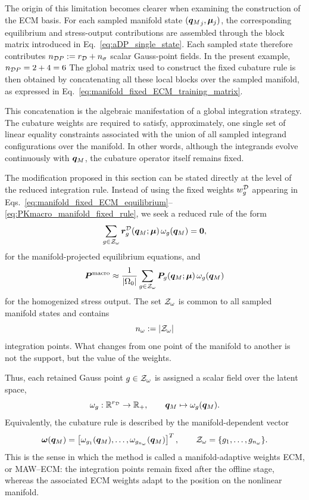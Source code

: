 \documentclass[11pt,a4paper]{article}
\begin{document}
The origin of this limitation becomes clearer when examining the construction
of the ECM basis. For each sampled manifold state
\(({\bm{q}_M}_j,\bm{\mu}_j)\), the corresponding equilibrium and stress-output
contributions are assembled through the block matrix introduced in
Eq.~\eqref{eq:aDP_single_state}. Each sampled state therefore contributes $n_{\mathcal{D}P}:=r_{\mathcal{D}}+n_{\sigma}$
scalar Gauss-point fields. In the present example, $n_{\mathcal{D}P} = 2 + 4 = 6$
The global matrix used to construct the fixed cubature rule is then obtained by
concatenating all these local blocks over the sampled manifold, as expressed in
Eq.~\eqref{eq:manifold_fixed_ECM_training_matrix}.

This concatenation is the algebraic manifestation of a global integration
strategy. The cubature weights are required to satisfy, approximately, one
single set of linear equality constraints associated with the union of all
sampled integrand configurations over the manifold. In other words, although
the integrands evolve continuously with \(\bm{q}_M\), the cubature operator itself
remains fixed.

The modification proposed in this section can be stated directly at the level
of the reduced integration rule. Instead of using the fixed weights
\(w^{\mathcal{D}}_{g}\) appearing in
Eqs.~\eqref{eq:manifold_fixed_ECM_equilibrium}--%
\eqref{eq:PKmacro_manifold_fixed_rule}, we seek a reduced rule of the form
\begin{equation}
\label{eq:MAW_ECM_equilibrium_intro}
    \sum_{g\in\mathcal{Z}_{\omega}}
    \bm{r}^{\mathcal{D}}_{g}(\bm{q}_M;\bm{\mu})\,\omega_{g}(\bm{q}_M)
    =
    \bm{0},
\end{equation}
for the manifold-projected equilibrium equations, and
\begin{equation}
\label{eq:MAW_ECM_PK_intro}
    \bm{P}^{\mathrm{macro}}
    \approx
    \frac{1}{|\Omega_0|}
    \sum_{g\in\mathcal{Z}_{\omega}}
    \boldsymbol{P}_g(\bm{q}_M;\bm{\mu})\,\omega_{g}(\bm{q}_M)
\end{equation}
for the homogenized stress output. The set \(\mathcal{Z}_{\omega}\) is common to all
sampled manifold states and contains
\[
    n_{\omega} := |\mathcal{Z}_{\omega}|
\]
integration points. What changes from one point of the manifold to another is
not the support, but the value of the weights.

Thus, each retained Gauss point \(g\in\mathcal{Z}_{\omega}\) is assigned a scalar field over
the latent space,
\[
    \omega_{g}:\mathbb{R}^{r_{\mathcal{D}}}\rightarrow\mathbb{R}_{+},
    \qquad
    \bm{q}_M\mapsto \omega_{g}(\bm{q}_M).
\]
Equivalently, the cubature rule is described by the manifold-dependent vector
\[
    \bm{\omega}(\bm{q}_M)
    =
    \left[
    \omega_{g_1}(\bm{q}_M),
    \ldots,
    \omega_{g_{n_{\omega}}}(\bm{q}_M)
    \right]^T,
    \qquad
    \mathcal{Z}_{\omega}=\{g_1,\ldots,g_{n_{\omega}}\}.
\]
This is the sense in which the method is called a
manifold-adaptive weights ECM, or MAW--ECM: the integration points remain fixed
after the offline stage, whereas the associated ECM weights adapt to the
position on the nonlinear manifold.
\end{document}

